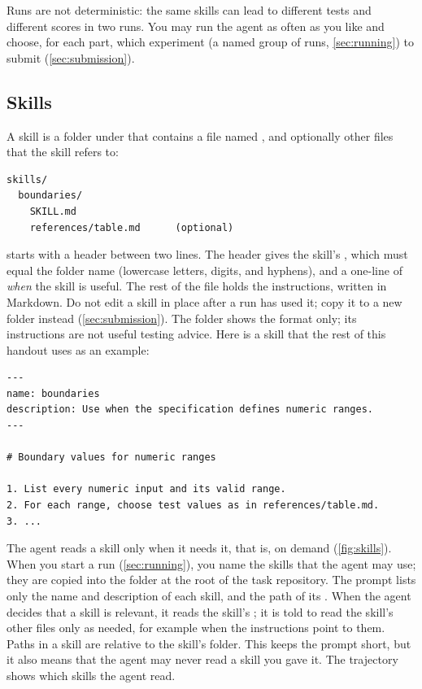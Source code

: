 \documentclass[letterpaper,11pt]{article}
\begin{document}
Runs are not deterministic: the same skills can lead to different tests and
different scores in two runs. You may run the agent as often as you like and choose, for each part, which experiment (a named group of runs, \autoref{sec:running}) to submit (\autoref{sec:submission}).

\subsection{Skills}
\label{sec:skills}

A skill is a folder under  that contains a file named
, and optionally other files that the skill refers to:

\smallskip

\noindent\begin{minipage}{\textwidth}
\begin{verbatim}
skills/
  boundaries/
    SKILL.md
    references/table.md      (optional)
\end{verbatim}
\end{minipage}

\smallskip
{} starts with a header between two \ic{-{}-{}-} lines. The header gives
the skill's , which must equal the folder name (lowercase letters,
digits, and hyphens), and a one-line
 of \emph{when} the skill is useful. The rest of the file holds
the instructions, written in Markdown. Do not edit a skill in place after a run has used it; copy it to a new folder instead (\autoref{sec:submission}). The folder
 shows the format only; its instructions are not useful testing advice. Here is a skill that the rest of this handout uses as an example:

\medskip

\noindent\begin{minipage}{\textwidth}
\begin{verbatim}
---
name: boundaries
description: Use when the specification defines numeric ranges.
---

# Boundary values for numeric ranges

1. List every numeric input and its valid range.
2. For each range, choose test values as in references/table.md.
3. ...
\end{verbatim}
\end{minipage}

\medskip

The agent reads a skill only when it needs it, that is, on demand
(\autoref{fig:skills}). When you
start a run (\autoref{sec:running}), you name the skills that the agent may use; they are copied into
the folder  at the root of the task repository. The prompt lists only the name and
description of each skill, and the path of its . When the agent decides that a skill is relevant, it
reads the skill's ; it is told to read the skill's other files only as needed, for example when
the instructions point to them. Paths in a skill are relative to the skill's folder. This keeps the prompt short, but it also means
that the agent may never read a skill you gave it. The trajectory shows which
skills the agent read.
\end{document}

